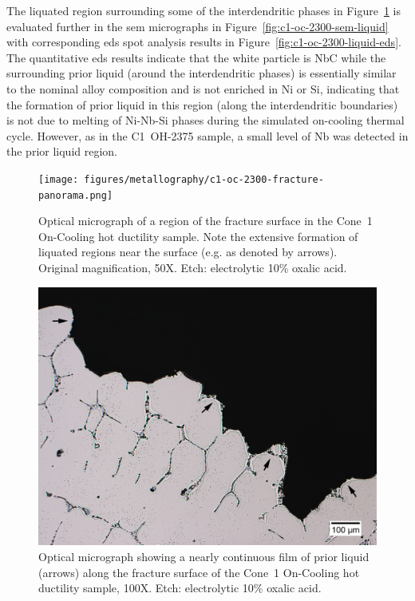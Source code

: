 {The liquated region surrounding some of the interdendritic phases in Figure~\ref{fig:c1-oc-2300-fracture-panorama} is evaluated further in the \gls{sem} micrographs in Figure~\ref{fig:c1-oc-2300-sem-liquid} with corresponding \gls{eds} spot analysis results in Figure~\ref{fig:c1-oc-2300-liquid-eds}. The quantitative \gls{eds} results indicate that the white particle is NbC while the surrounding prior liquid (around the interdendritic phases) is essentially similar to the nominal alloy composition and is not enriched in Ni or Si, indicating that the formation of prior liquid in this region (along the interdendritic boundaries) is not due to melting of Ni-Nb-Si phases during the simulated on-cooling thermal cycle. However, as in the C1~OH-2375 sample, a small level of Nb was detected in the prior liquid region.

\clearpage
\renewcommand{\headrulewidth}{0pt}
\thispagestyle{lscapedplain}
\begin{landscape}
\begin{figure}
    \centering
    \texttt{[image: figures/metallography/c1-oc-2300-fracture-panorama.png]}
    \caption[Optical micrograph of a region of the fracture surface in the Cone~1 On-Cooling \protect{} hot ductility sample.]{Optical micrograph of a region of the fracture surface in the Cone~1 On-Cooling \protect{} hot ductility sample. Note the extensive formation of liquated regions near the surface (e.g. as denoted by arrows). Original magnification, 50X. Etch: electrolytic 10\% oxalic acid.}
    \label{fig:c1-oc-2300-fracture-panorama}
\end{figure}
\end{landscape}
\clearpage


\begin{figure}
    \centering
    \includegraphics[width=4.7in]{figures/metallography/c1-oc-2300-liquation-surface-100x.png}
    \caption{Optical micrograph showing a nearly continuous film of prior liquid (arrows) along the fracture surface of the Cone~1 On-Cooling \protect{} hot ductility sample, 100X. Etch: electrolytic 10\% oxalic acid.}
    \label{fig:c1-oc-2300-liquation-surface}
\end{figure}

}
